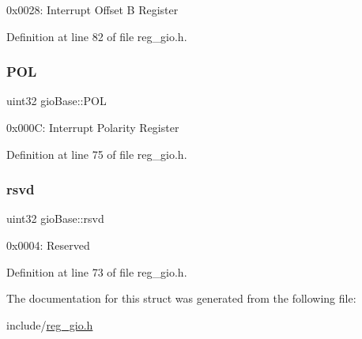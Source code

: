 0x0028\+: Interrupt Offset B Register 

Definition at line 82 of file reg\+\_\+gio.\+h.

\mbox{\label{structgioBase_a50608ea9dd682b4469235370ec534efc}} 
\subsubsection{\texorpdfstring{P\+OL}{POL}}
{\footnotesize\ttfamily uint32 gio\+Base\+::\+P\+OL}

0x000C\+: Interrupt Polarity Register 

Definition at line 75 of file reg\+\_\+gio.\+h.

\mbox{\label{structgioBase_a9c230d342103baff11e8098e61649191}} 
\subsubsection{\texorpdfstring{rsvd}{rsvd}}
{\footnotesize\ttfamily uint32 gio\+Base\+::rsvd}

0x0004\+: Reserved 

Definition at line 73 of file reg\+\_\+gio.\+h.



The documentation for this struct was generated from the following file\+:\begin{DoxyCompactItemize}
\item 
include/\mbox{\hyperlink{reg__gio_8h}{reg\+\_\+gio.\+h}}\end{DoxyCompactItemize}

